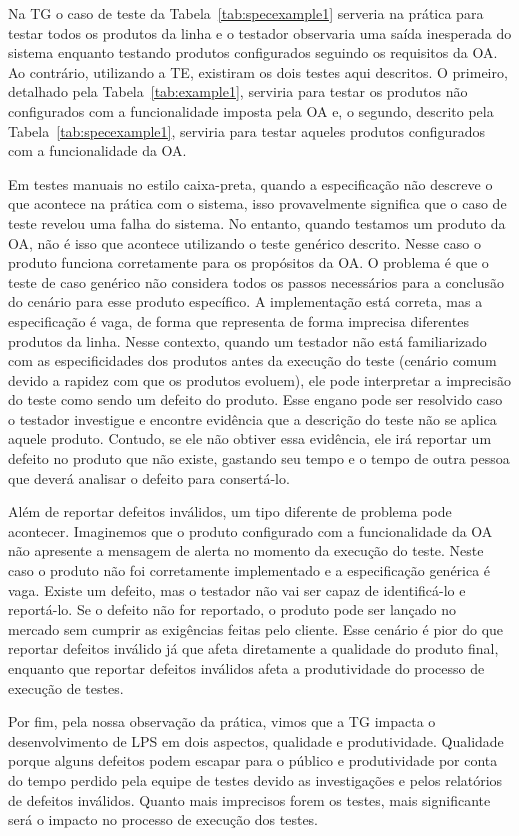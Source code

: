 Na TG o caso de teste da Tabela~\ref{tab:specexample1} serveria na prática para
testar todos os produtos da linha e o testador observaria uma saída inesperada
do sistema enquanto testando produtos configurados seguindo os requisitos da OA.
Ao contrário, utilizando a TE, existiram os dois testes aqui descritos. O
primeiro, detalhado pela Tabela~\ref{tab:example1}, serviria para testar os
produtos não configurados com a funcionalidade imposta pela OA e, o segundo,
descrito pela Tabela~\ref{tab:specexample1}, serviria para testar aqueles
produtos configurados com a funcionalidade da OA.

Em testes manuais no estilo caixa-preta, quando a especificação não descreve o
que acontece na prática com o sistema, isso provavelmente significa que o caso
de teste revelou uma falha do sistema. No entanto, quando testamos um produto da
OA, não é isso que acontece utilizando o teste genérico descrito. Nesse caso o
produto funciona corretamente para os propósitos da OA. O problema é que o teste
de caso genérico não considera todos os passos necessários para a conclusão do
cenário para esse produto específico. A implementação está correta, mas a
especificação é vaga, de forma que representa de forma imprecisa diferentes
produtos da linha. Nesse contexto, quando um testador não está familiarizado com
as especificidades dos produtos antes da execução do teste (cenário comum
devido a rapidez com que os produtos evoluem), ele pode interpretar a imprecisão
do teste como sendo um defeito do produto. Esse engano pode ser resolvido caso o
testador investigue e encontre evidência que a descrição do teste não se aplica
aquele produto. Contudo, se ele não obtiver essa evidência, ele irá reportar um
defeito no produto que não existe, gastando seu tempo e o tempo de outra pessoa
que deverá analisar o defeito para consertá-lo.

Além de reportar defeitos inválidos, um tipo diferente de problema pode
acontecer. Imaginemos que o produto configurado com a funcionalidade da OA não
apresente a mensagem de alerta no momento da execução do teste. Neste caso o
produto não foi corretamente implementado e a especificação genérica é vaga.
Existe um defeito, mas o testador não vai ser capaz de identificá-lo e
reportá-lo. Se o defeito não for reportado, o produto pode ser lançado no
mercado sem cumprir as exigências feitas pelo cliente. Esse cenário é pior do
que reportar defeitos inválido já que afeta diretamente a qualidade do produto
final, enquanto que reportar defeitos inválidos afeta a produtividade do
processo de execução de testes.

Por fim, pela nossa observação da prática, vimos que a TG impacta o
desenvolvimento de LPS em dois aspectos, qualidade e produtividade. Qualidade
porque alguns defeitos podem escapar para o público e produtividade por conta do
tempo perdido pela equipe de testes devido as investigações e pelos relatórios
de defeitos inválidos. Quanto mais imprecisos forem os testes, mais significante
será o impacto no processo de execução dos testes.
